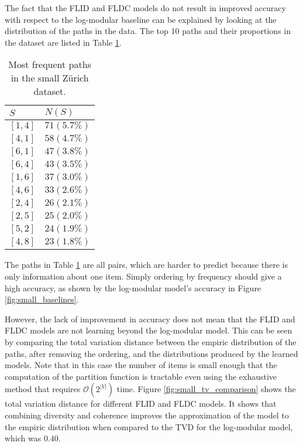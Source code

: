 The fact that the FLID and FLDC models do not result in improved accuracy with respect to the log-modular baseline can be explained by looking at the distribution of the paths in the data. The top 10 paths and their proportions in the dataset are listed in Table \ref{tab:small_top_paths}.

\begin{table}
  \centering
  \caption{Most frequent paths in the small Zürich dataset.}
  \begin{tabular}{@{}ll@{}}
    \toprule
    $S$ & $N(S)$\\
    \midrule
    $[1,4]$ & $71 (5.7\%)$ \\
    $[4,1]$ & $58 (4.7\%)$ \\
    $[6,1]$ & $47 (3.8\%)$ \\
    $[6,4]$ & $43 (3.5\%)$ \\
    $[1,6]$ & $37 (3.0\%)$ \\
    $[4,6]$ & $33 (2.6\%)$ \\
    $[2,4]$ & $26 (2.1\%)$ \\
    $[2,5]$ & $25 (2.0\%)$ \\
    $[5,2]$ & $24 (1.9\%)$ \\
    $[4,8]$ & $23 (1.8\%)$ \\
    \bottomrule
  \end{tabular}
  \label{tab:small_top_paths}
\end{table}

The paths in Table \ref{tab:small_top_paths} are all pairs, which are harder to predict because there is only information about one item. Simply ordering by frequency should give a high accuracy, as shown by the log-modular model's accuracy in Figure \ref{fig:small_baselines}.

However, the lack of improvement in accuracy does not mean that the FLID and FLDC models are not learning beyond the log-modular model. This can be seen by comparing the total variation distance between the empiric distribution of the paths, after removing the ordering, and the distributions produced by the learned models. Note that in this case the number of items is small enough that the computation of the partition function is tractable even using the exhaustive method that requires $\mathcal{O}(2^{|V|})$ time. Figure \ref{fig:small_tv_comparison} shows the total variation distance for different FLID and FLDC models. It shows that combining diversity and coherence improves the approximation of the model to the empiric distribution when compared to the TVD for the log-modular model, which was $0.40$.

